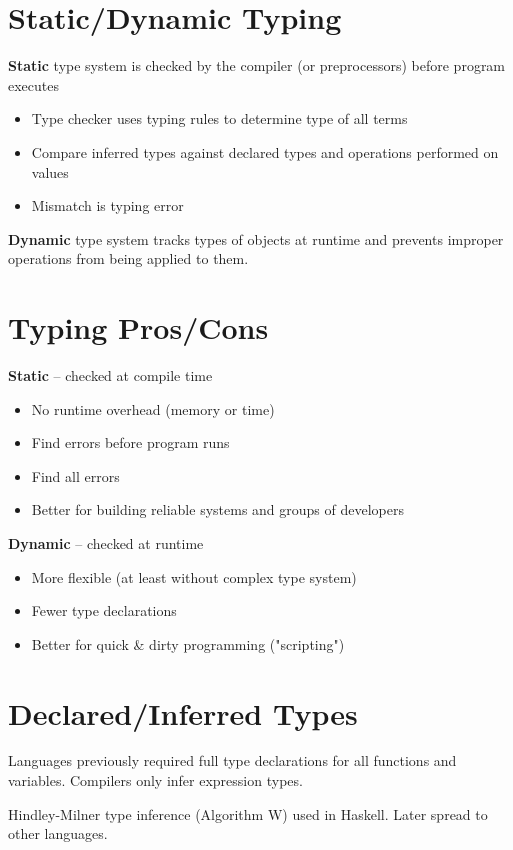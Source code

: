 \documentclass[11pt]{article}
\begin{document}
\section*{Static/Dynamic Typing}

\textbf{Static} type system is checked by the compiler (or preprocessors) before program executes
\begin{itemize}
	\item Type checker uses typing rules to determine type of all terms
	\item Compare inferred types against declared types and operations performed on values
	\item Mismatch is typing error
\end{itemize}

\textbf{Dynamic} type system tracks types of objects at runtime and prevents improper operations from being applied to them.

\section*{Typing Pros/Cons}

\textbf{Static} -- checked at compile time
\begin{itemize}
	\item No runtime overhead (memory or time)
	\item Find errors before program runs
	\item Find all errors
	\item Better for building reliable systems and groups of developers
\end{itemize}

\textbf{Dynamic} -- checked at runtime
\begin{itemize}
	\item More flexible (at least without complex type system)
	\item Fewer type declarations
	\item Better for quick & dirty programming ("scripting")
\end{itemize}

\section*{Declared/Inferred Types}

Languages previously required full type declarations for all functions and variables. Compilers only infer expression types.

Hindley-Milner type inference (Algorithm W) used in Haskell. 
Later spread to other languages.
\end{document}
